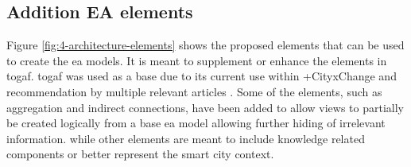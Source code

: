 \subsection{Addition EA elements}

Figure \ref{fig:4-architecture-elements} shows the proposed elements that can be used to create the \gls{ea} models. It is meant to supplement or enhance the elements in \gls{togaf}. \gls{togaf} was used as a base due to its current use within +CityxChange and recommendation by multiple relevant articles \cite{7580810, pourzolfaghar2016types}.
Some of the elements, such as aggregation and indirect connections, have been added to allow views to partially be created logically from a base \gls{ea} model allowing further hiding of irrelevant information. while other elements are meant to include knowledge related components or better represent the smart city context.

